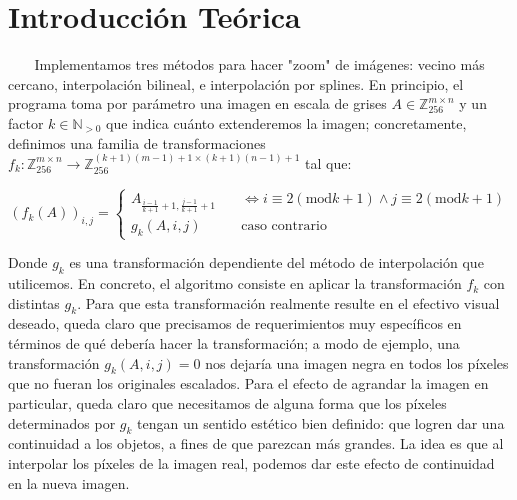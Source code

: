 \documentclass{article}
\begin{document}
{} %

\grupo{     
\\
}
 
\maketitle

\pagebreak

\section*{Introducción Teórica}{}

$\ $ $\ $ $\ $ $\ $Implementamos tres métodos para hacer "zoom" de imágenes: vecino más cercano, interpolación bilineal, e interpolación por splines. En principio, el programa toma por parámetro una imagen en escala de grises $A \in \mathbb{Z}_{256}^{m \times n}$ y un factor $k \in \mathbb{N}_{>0}$ que indica cuánto extenderemos la imagen; concretamente, definimos una familia de transformaciones $f_k : \mathbb{Z}_{256}^{m \times n} \to \mathbb{Z}_{256}^{(k+1)(m-1)+1 \times (k+1)(n-1)+1}$ tal que:

$$(f_k(A))_{i, j} =
    \begin{cases}
        A_{\frac{i - 1}{k + 1} + 1, \frac{j - 1}{k + 1} + 1} & \quad \iff i \equiv 2 (\text{mod} k+1) \wedge j \equiv 2 (\text{mod} k+1) \\
        g_k(A, i, j) & \quad \text{caso contrario}
    \end{cases}$$

Donde $g_k$ es una transformación dependiente del método de interpolación que utilicemos. En concreto, el algoritmo consiste en aplicar la transformación $f_k$ con distintas $g_k$. Para que esta transformación realmente resulte en el efectivo visual deseado, queda claro que precisamos de requerimientos muy específicos en términos de qué debería hacer la transformación; a modo de ejemplo, una transformación $g_k(A, i, j) = 0$ nos dejaría una imagen negra en todos los píxeles que no fueran los originales escalados. Para el efecto de agrandar la imagen en particular, queda claro que necesitamos de alguna forma que los píxeles determinados por $g_k$ tengan un sentido estético bien definido: que logren dar una continuidad a los objetos, a fines de que parezcan más grandes. La idea es que al interpolar los píxeles de la imagen real, podemos dar este efecto de continuidad en la nueva imagen.
\end{document}
